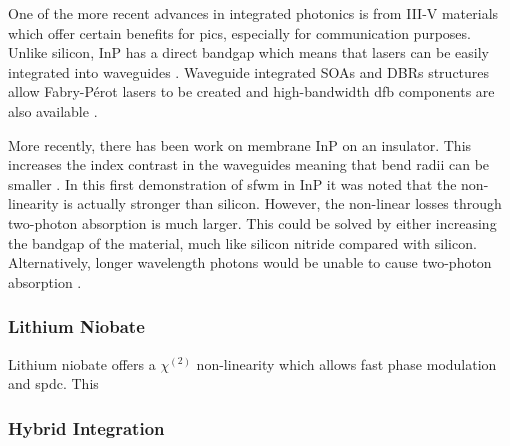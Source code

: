 One of the more recent advances in integrated photonics is from III-V materials which offer certain benefits for \acp{pic}, especially for communication purposes. Unlike silicon, \Ac{InP} has a direct bandgap which means that lasers can be easily integrated into waveguides \cite{smit2014}. Waveguide integrated \acp{SOA} and \acp{DBR} structures allow Fabry-P\'{e}rot lasers to be created and high-bandwidth \ac{dfb} components are also available \cite{smit2014, jeppix}.

More recently, there has been work on membrane \ac{InP} on an insulator. This increases the index contrast in the waveguides meaning that bend radii can be smaller \cite{Kumar2019}. In this first demonstration of \ac{sfwm} in \ac{InP} it was noted that the non-linearity is actually stronger than silicon. However, the non-linear losses through two-photon absorption is much larger. This could be solved by either increasing the bandgap of the material, much like silicon nitride compared with silicon. Alternatively, longer wavelength photons would be unable to cause two-photon absorption \cite{rosenfeld2019mid}. 






\subsubsection*{Lithium Niobate}

Lithium niobate offers a $\chi^{(2)}$ non-linearity which allows fast phase modulation and \ac{spdc}. This 

\subsubsection{Hybrid Integration}

